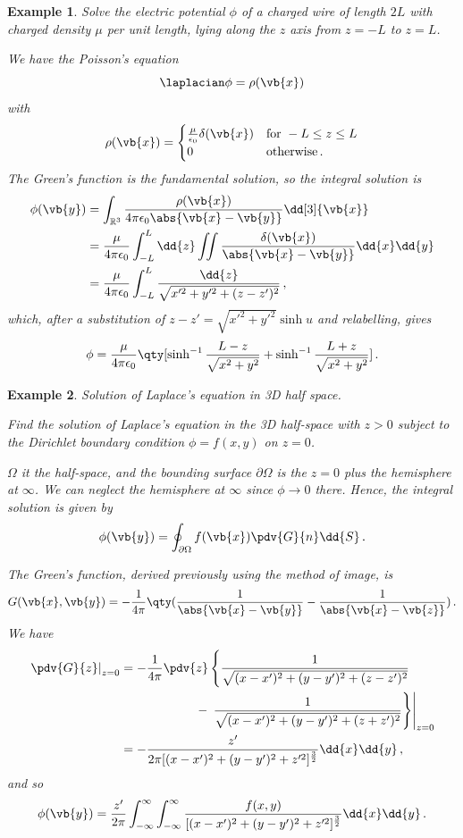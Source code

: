 \documentclass{article}
\theoremstyle{plain}\theoremheaderfont{\normalfont\itshape}\theorembodyfont{\rmfamily}\theoremseparator{.}\newtheorem*{rem}{Remark}\newtheorem*{ex}{Example}\newtheorem*{proof}{Proof}\newtheorem*{altp}{Alternative proof}
\theoremstyle{plain}\theoremheaderfont{\normalfont\bfseries}\theorembodyfont{\rmfamily}\theoremseparator{.}\newtheorem{thm}{Theorem}[section]\newtheorem{lem}[thm]{Lemma}\newtheorem{prop}[thm]{Proposition}\newtheorem*{cor}{Corollary}\newtheorem{defn}[thm]{Definition}\newtheorem{clm}[thm]{Claim}\newtheorem{clminproof}{Claim}
\theoremstyle{break}\theoremheaderfont{\normalfont\itshape}\theorembodyfont{\rmfamily}\theoremseparator{.\medskip}\newtheorem*{proofskip}{Proof}\newtheorem*{exs}{Examples}\newtheorem*{rems}{Remarks}
\theoremstyle{break}\theoremheaderfont{\normalfont\bfseries}\theorembodyfont{\rmfamily}\theoremseparator{.\medskip}\newtheorem{lemskip}[thm]{Lemma}\newtheorem{defnskip}[thm]{Definition}\newtheorem{propskip}[thm]{Proposition}\newtheorem{thmskip}[thm]{Theorem}
\numberwithin{equation}{section}
\begin{document}
	\begin{ex}
		Solve the electric potential \(\phi\) of a charged wire of length \(2L\) with charged density \(\mu\) per unit length, lying along the \(z\) axis from \(z=-L\) to \(z=L\).
		
		We have the Poisson's equation
		\[\laplacian\phi=\rho(\vb{x})\]
		with
		\[\rho(\vb{x})=\begin{cases}
			\frac{\mu}{\epsilon_0}\delta(\vb{x}) & \text{for }-L\le z\le L\\
			0 & \text{otherwise}\,.
		\end{cases}\]
		The Green's function is the fundamental solution, so the integral solution is
		\begin{align*}
			\phi(\vb{y})&=\int_{\mathbb{R}^3}\frac{\rho(\vb{x})}{4\pi\epsilon_0\abs{\vb{x}-\vb{y}}}\dd[3]{\vb{x}}\\
			&=\frac{\mu}{4\pi\epsilon_0}\int_{-L}^{L}\dd{z}\iint\frac{\delta(\vb{x})}{\abs{\vb{x}-\vb{y}}}\dd{x}\dd{y}\\
			&=\frac{\mu}{4\pi\epsilon_0}\int_{-L}^{L}\frac{\dd{z}}{\sqrt{x'^2+y'^2+(z-z')^2}}\,,
		\end{align*}
		which, after a substitution of \(z-z'=\sqrt{x'^2+y'^2}\sinh u\) and relabelling, gives
		\[\phi=\frac{\mu}{4\pi\epsilon_0}\qty[\sinh^{-1}\frac{L-z}{\sqrt{x^2+y^2}}+\sinh^{-1}\frac{L+z}{\sqrt{x^2+y^2}}]\,.\]
	\end{ex}

	\begin{ex}
		\textit{Solution of Laplace's equation in 3D half space.}
		
		Find the solution of Laplace's equation in the 3D half-space with \(z>0\) subject to the Dirichlet boundary condition \(\phi=f(x,y)\) on \(z=0\).

		\(\Omega\) it the half-space, and the bounding surface \({\partial\Omega}\) is the \(z=0\) plus the hemisphere at \(\infty\). We can neglect the hemisphere at \(\infty\) since \(\phi\to 0\) there. Hence, the integral solution is given by
		\[\phi(\vb{y})=\oint_{\partial\Omega}f(\vb{x})\pdv{G}{n}\dd{S}\,.\]

		The Green's function, derived previously using the method of image, is
		\[G(\vb{x},\vb{y})=-\frac{1}{4\pi}\qty(\frac{1}{\abs{\vb{x}-\vb{y}}}-\frac{1}{\abs{\vb{x}-\vb{z}}})\,.\]
		We have
		\begin{align*}
			\left.\pdv{G}{z}\right|_{z=0}&=-\frac{1}{4\pi}\pdv{z}\left\{\frac{1}{\sqrt{(x-x')^2+(y-y')^2+(z-z')^2}}\right.\\
			&\qquad\qquad\qquad-\left.\left.\frac{1}{\sqrt{(x-x')^2+(y-y')^2+(z+z')^2}}\right\}\right|_{z=0}\\
			&=-\frac{z'}{2\pi[(x-x')^2+(y-y')^2+z'^2]^\frac{3}{2}}\dd{x}\dd{y}\,,
		\end{align*}
		and so
		\[\phi(\vb{y})=\frac{z'}{2\pi}\int_{-\infty}^{\infty}\int_{-\infty}^{\infty}\frac{f(x,y)}{[(x-x')^2+(y-y')^2+z'^2]^\frac{3}{2}}\dd{x}\dd{y}\,.\]
	\end{ex}
	
\end{document}
